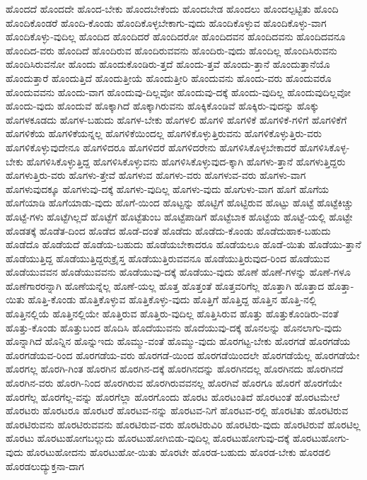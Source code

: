 {ಹೊಂದದೆ
ಹೊಂದದೇ
ಹೊಂದ-ಬೇಕು
ಹೊಂದಬೇಕೆಂದು
ಹೊಂದಬೇಡ
ಹೊಂದಲು
ಹೊಂದಲ್ಪಟ್ಟಿತು
ಹೊಂದಿ
ಹೊಂದಿಕೊಂಡರೆ
ಹೊಂದಿ-ಕೊಂಡು
ಹೊಂದಿಕೊಳ್ಳಬೇಕಾಗು-ವುದು
ಹೊಂದಿಕೊಳ್ಳುವ
ಹೊಂದಿಕೊಳ್ಳು-ವಾಗ
ಹೊಂದಿಕೊಳ್ಳು-ವುದಿಲ್ಲ
ಹೊಂದಿದ
ಹೊಂದಿದರೆ
ಹೊಂದಿದರೋ
ಹೊಂದಿದವನ
ಹೊಂದಿದವನು
ಹೊಂದಿದವನೂ
ಹೊಂದಿದ-ವರು
ಹೊಂದಿದೆ
ಹೊಂದಿರುವ
ಹೊಂದಿರುವವನು
ಹೊಂದಿರು-ವುದು
ಹೊಂದಿಲ್ಲ
ಹೊಂದಿಸಿರುವನು
ಹೊಂದಿಸಿರುವನೋ
ಹೊಂದು
ಹೊಂದುಕೊಂಡಿರು-ತ್ತದೆ
ಹೊಂದು-ತ್ತವೆ
ಹೊಂದು-ತ್ತಾನೆ
ಹೊಂದುತ್ತಾನೆಯೊ
ಹೊಂದುತ್ತಾರೆ
ಹೊಂದುತ್ತಿದೆ
ಹೊಂದುತ್ತೀಯೆ
ಹೊಂದುತ್ತೀರಿ
ಹೊಂದುವನು
ಹೊಂದು-ವರು
ಹೊಂದುವರೊ
ಹೊಂದುವವನು
ಹೊಂದು-ವಾಗ
ಹೊಂದುವು-ದಿಲ್ಲವೋ
ಹೊಂದುವು-ದಕ್ಕೆ
ಹೊಂದು-ವುದಿಲ್ಲ
ಹೊಂದುವುದಿಲ್ಲವೋ
ಹೊಂದು-ವುದು
ಹೊಂದುವೆ
ಹೊಕ್ಕಾಗಿದೆ
ಹೊಕ್ಕಾಗಿರುವನು
ಹೊಕ್ಕಿಕೊಂಡಿವೆ
ಹೊಕ್ಕಿರು-ವುದನ್ನು
ಹೊಕ್ಕು
ಹೊಗಳಕೂಡದು
ಹೊಗಳ-ಬಹುದು
ಹೊಗಳ-ಬೇಕು
ಹೊಗಳಲಿ
ಹೊಗಳಿ
ಹೊಗಳಿಕೆ
ಹೊಗಳಿಕೆ-ಗಳಿಗೆ
ಹೊಗಳಿಕೆಗೆ
ಹೊಗಳಿಕೆಯ
ಹೊಗಳಿಕೆಯನ್ನಲ್ಲ
ಹೊಗಳಿಕೆಯಿಂದಲ್ಲ
ಹೊಗಳಿಕೊಳ್ಳುತ್ತಿರುವನು
ಹೊಗಳಿಕೊಳ್ಳುತ್ತಿರು-ವರು
ಹೊಗಳಿಕೊಳ್ಳುವುದೇನೂ
ಹೊಗಳಿದರೂ
ಹೊಗಳಿದರೆ
ಹೊಗಳಿದರೇನು
ಹೊಗಳಿಸಿಕೊಳ್ಳಬೇಕಾದರೆ
ಹೊಗಳಿಸಿಕೊಳ್ಳ-ಬೇಕು
ಹೊಗಳಿಸಿಕೊಳ್ಳುತ್ತಿದ್ದ
ಹೊಗಳಿಸಿಕೊಳ್ಳುವನು
ಹೊಗಳಿಸಿಕೊಳ್ಳುವುದ-ಕ್ಕಾಗಿ
ಹೊಗಳು-ತ್ತಾನೆ
ಹೊಗಳುತ್ತಿದ್ದರು
ಹೊಗಳುತ್ತಿರು-ವರು
ಹೊಗಳು-ತ್ತೇವೆ
ಹೊಗಳುವ
ಹೊಗಳು-ವರು
ಹೊಗಳುವ-ವರು
ಹೊಗಳು-ವಾಗ
ಹೊಗಳುವುದಕ್ಕೂ
ಹೊಗಳುವು-ದಕ್ಕೆ
ಹೊಗಳು-ವುದಿಲ್ಲ
ಹೊಗಳು-ವುದು
ಹೊಗುಳು-ವಾಗ
ಹೊಗೆ
ಹೊಗೆಯ
ಹೊಗೆಯಾಡಿ
ಹೊಗೆಯಾಡು-ವುದು
ಹೊಗೆ-ಯಿಂದ
ಹೊಟ್ಟನ್ನು
ಹೊಟ್ಟಿಗೆ
ಹೊಟ್ಟಿರುವ
ಹೊಟ್ಟು
ಹೊಟ್ಟೆ
ಹೊಟ್ಟೆಕಿಚ್ಚು
ಹೊಟ್ಟೆ-ಗಳು
ಹೊಟ್ಟೆಗಿಲ್ಲದೆ
ಹೊಟ್ಟೆಗೆ
ಹೊಟ್ಟೆತುಂಬ
ಹೊಟ್ಟೆಪಾಡಿಗೆ
ಹೊಟ್ಟೆಬಾಕ
ಹೊಟ್ಟೆಯ
ಹೊಟ್ಟೆ-ಯಲ್ಲಿ
ಹೊಟ್ಟೇ
ಹೊಡತಕ್ಕೆ
ಹೊಡೆತ-ದಿಂದ
ಹೊಡೆದ
ಹೊಡೆ-ದಂತೆ
ಹೊಡೆದು
ಹೊಡೆದು-ಕೊಂಡು
ಹೊಡೆದುಹಾಕ-ಬಹುದು
ಹೊಡೆದೊ
ಹೊಡೆಯದೆ
ಹೊಡೆಯ-ಬಹುದು
ಹೊಡೆಯಬೇಕಾದರೂ
ಹೊಡೆಯಲೂ
ಹೊಡೆ-ಯಿತು
ಹೊಡೆಯು-ತ್ತಾನೆ
ಹೊಡೆಯುತ್ತಿದ್ದ
ಹೊಡೆಯುತ್ತಿದ್ದರುಕ್ರೈಸ್ತ
ಹೊಡೆಯುತ್ತಿರುವವನೂ
ಹೊಡೆಯುತ್ತಿರುವುದ-ರಿಂದ
ಹೊಡೆಯುವ
ಹೊಡೆಯುವವನ
ಹೊಡೆಯುವವನು
ಹೊಡೆಯುವು-ದಕ್ಕೆ
ಹೊಡೆಯು-ವುದು
ಹೊಣೆ
ಹೊಣೆ-ಗಳನ್ನು
ಹೊಣೆ-ಗಳೂ
ಹೊಣೆಗಾರರನ್ನಾಗಿ
ಹೊಣೆಯನ್ನೆಲ್ಲ
ಹೊಣೆ-ಯಲ್ಲ
ಹೊತ್ತ
ಹೊತ್ತಂತೆ
ಹೊತ್ತವರಿಗೆಲ್ಲ
ಹೊತ್ತಾಗಿ
ಹೊತ್ತಾದ
ಹೊತ್ತಾ-ಯಿತು
ಹೊತ್ತಿ-ಕೊಂಡು
ಹೊತ್ತಿಕೊಳ್ಳುವ
ಹೊತ್ತಿಕೊಳ್ಳು-ವುದು
ಹೊತ್ತಿಗೆ
ಹೊತ್ತಿದ್ದ
ಹೊತ್ತಿನ
ಹೊತ್ತಿ-ನಲ್ಲಿ
ಹೊತ್ತಿನಲ್ಲಿಯೆ
ಹೊತ್ತಿನಲ್ಲಿಯೇ
ಹೊತ್ತಿರುವ
ಹೊತ್ತಿರು-ವುದಿಲ್ಲ
ಹೊತ್ತಿಸಿರುವ
ಹೊತ್ತು
ಹೊತ್ತುಕೊಂಡಿರು-ವಂತೆ
ಹೊತ್ತು-ಕೊಂಡು
ಹೊತ್ತುಬಂದ
ಹೊದಿಸಿ
ಹೊದೆಯುವನು
ಹೊದೆಯುವು-ದಕ್ಕೆ
ಹೊನಲನ್ನು
ಹೊನಲಾಗು-ವುದು
ಹೊನ್ನಾಗಿದೆ
ಹೊನ್ನಿನ
ಹೊನ್ನುಇದು
ಹೊಮ್ಮು-ವಂತೆ
ಹೊಮ್ಮು-ವುದು
ಹೊರಗಟ್ಟ-ಬೇಕು
ಹೊರಗಡೆ
ಹೊರಗಡೆಯ
ಹೊರಗಡೆಯವ-ರಿಂದ
ಹೊರಗಡೆಯ-ವರು
ಹೊರಗಡೆ-ಯಿಂದ
ಹೊರಗಡೆಯಿಂದಲೇ
ಹೊರಗಡೆಯೆಲ್ಲ
ಹೊರಗಡೆಯೇ
ಹೊರಗಲ್ಲ
ಹೊರಗಿ-ಗಿಂತ
ಹೊರಗಿನ
ಹೊರಗಿನ-ದಕ್ಕೆ
ಹೊರಗಿನದನ್ನು
ಹೊರಗಿನದಲ್ಲ
ಹೊರಗಿನದು
ಹೊರಗಿನದೆ
ಹೊರಗಿನ-ವರು
ಹೊರಗಿ-ನಿಂದ
ಹೊರಗಿರುವ
ಹೊರಗಿರುವವನಲ್ಲ
ಹೊರಗಿವೆ
ಹೊರಗೂ
ಹೊರಗೆ
ಹೊರಗೆಯೇ
ಹೊರಗೆಲ್ಲ
ಹೊರಗೆಲ್ಲ-ವನ್ನು
ಹೊರಗೆಲ್ಲಾ
ಹೊರಗೊಂದು
ಹೊರಟ
ಹೊರಟಂತಿದೆ
ಹೊರಟಂತೆ
ಹೊರಟಮೇಲೆ
ಹೊರಟರು
ಹೊರಟರೂ
ಹೊರಟರೆ
ಹೊರಟವ-ನನ್ನು
ಹೊರಟವ-ನಿಗೆ
ಹೊರಟವ-ರಲ್ಲಿ
ಹೊರಟಿತು
ಹೊರಟಿರುವ
ಹೊರಟಿರುವನು
ಹೊರಟಿರುವವನು
ಹೊರಟಿರುವ-ವರು
ಹೊರಟಿರುವಿರಿ
ಹೊರಟಿರು-ವುದು
ಹೊರಟಿರುವೆ
ಹೊರಟಿಲ್ಲ
ಹೊರಟು
ಹೊರಟುಹೋಗಬಲ್ಲುದು
ಹೊರಟುಹೋಗಿಬಿಡು-ವುದಿಲ್ಲ
ಹೊರಟುಹೋಗುವು-ದಕ್ಕೆ
ಹೊರಟುಹೋಗು-ವುದು
ಹೊರಟುಹೋದನು
ಹೊರಟುಹೋ-ಯಿತು
ಹೊರಟೇ
ಹೊರಡ-ಬಹುದು
ಹೊರಡ-ಬೇಕು
ಹೊರಡಲಿ
ಹೊರಡಲುದ್ಯುಕ್ತನಾ-ದಾಗ
}
